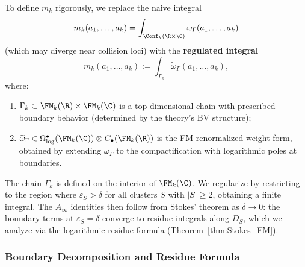 \begin{convention}
\label{const:regularized_mk}
To define $m_k$ rigorously, we replace the naive integral
\[
m_k(a_1, \ldots, a_k) = \int_{\Conf_k(\R \times \C)} \omega_\Gamma(a_1, \ldots, a_k)
\]
(which may diverge near collision loci) with the \textbf{regulated integral}
\[
m_k(a_1, \ldots, a_k) := \int_{\Gamma_k} \widetilde{\omega}_\Gamma(a_1, \ldots, a_k),
\]
where:
\begin{enumerate}[label=(\roman*)]
\item $\Gamma_k \subset \FM_k(\R) \times \FM_k(\C)$ is a top-dimensional chain with prescribed boundary behavior (determined by the theory's BV structure);

\item $\widetilde{\omega}_\Gamma \in \Omega^{\bullet}_{\log}(\FM_k(\C)) \otimes C_\bullet(\FM_k(\R))$ is the FM-renormalized weight form, obtained by extending $\omega_\Gamma$ to the compactification with logarithmic poles at boundaries.
\end{enumerate}

The chain $\Gamma_k$ is defined on the interior of $\FM_k(\C)$. We regularize by restricting to the region where $\varepsilon_S > \delta$ for all clusters $S$ with $|S| \geq 2$, obtaining a finite integral. The $A_\infty$ identities then follow from Stokes' theorem as $\delta \to 0$: the boundary terms at $\varepsilon_S = \delta$ converge to residue integrals along $D_S$, which we analyze via the logarithmic residue formula (Theorem~\ref{thm:Stokes_FM}).
\end{convention}

\subsubsection{Boundary Decomposition and Residue Formula}

